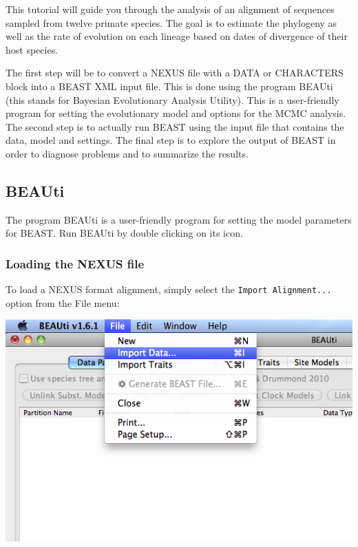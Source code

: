\documentclass[12pt]{article}
\begin{document}
This tutorial will guide you through the analysis of an alignment of sequences sampled from twelve primate species. The goal is to estimate the phylogeny as well as the rate of evolution on each lineage based on dates of divergence of their host species. 

The first step will be to convert a NEXUS file with a DATA or CHARACTERS block into a BEAST XML input file. This is done using the program BEAUti (this stands for Bayesian Evolutionary Analysis Utility). This is a user-friendly program for setting the evolutionary model and options for the MCMC analysis. The second step is to actually run BEAST using the input file that
contains the data, model and settings. The final step is to explore the output of BEAST in order to diagnose problems and to summarize the results.

\subsection*{BEAUti }

The program BEAUti is a user-friendly program for setting the
model parameters for BEAST. Run BEAUti by double clicking on its icon. 

\subsubsection*{Loading the NEXUS file }

To load a NEXUS format alignment, simply select the \texttt{Import
Alignment...} option from the File menu: 

\medskip{}

\includegraphics[scale=0.5]{figures/ImportNexus}
\end{document}
